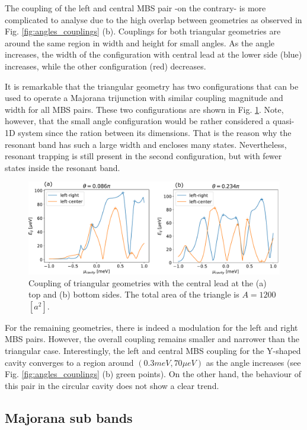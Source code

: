 The coupling of the left and central MBS pair -on the contrary- is more complicated to analyse due to the high overlap between geometries as observed in Fig. \ref{fig:angles_couplings} (b).
Couplings for both triangular geometries are around the same region in width and height for small angles.
As the angle increases, the width of the configuration with central lead at the lower side (blue) increases, while the other configuration (red) decreases.

It is remarkable that the triangular geometry has two configurations that can be used to operate a Majorana trijunction with similar coupling magnitude and width for all MBS pairs.
These two configurations are shown in Fig. \ref{fig:triangle_transition}.
Note, however, that the small angle configuration would be rather considered a quasi-1D system since the ration between its dimensions.
That is the reason why the resonant band has such a large width and encloses many states.
Nevertheless, resonant trapping is still present in the second configuration, but with fewer states inside the resonant band.

\begin{figure}[h!]
\centering
  \includegraphics[width=0.8\linewidth]{figures/triangle_couplings.pdf}
  \caption{Coupling of triangular geometries with the central lead at the (a) top and (b) bottom sides. The total area of the triangle is $A=1200$ $[a^2]$.}
  \label{fig:triangle_transition}
\end{figure}

For the remaining geometries, there is indeed a modulation for the left and right MBS pairs.
However, the overall coupling remains smaller and narrower than the triangular case.
Interestingly, the left and central MBS coupling for the Y-shaped cavity converges to a region around $(0.3 meV, 70 \mu eV)$ as the angle increases (see Fig. \ref{fig:angles_couplings} (b) green points).
On the other hand, the behaviour of this pair in the circular cavity does not show a clear trend.

\subsection{Majorana sub bands}

